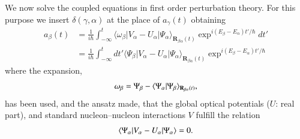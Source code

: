 \begin{subappendices}
 
 We now solve the coupled equations in first order perturbation theory. For this purpose we insert $\delta(\gamma,\alpha)$ at the place of $a_\gamma(t)$ obtaining 
 \begin{align}\label{eqintroB17}
 \nonumber a_\beta(t)&=\frac{1}{i\hbar}\int_{-\infty}^{t}\langle\omega_\beta|V_\alpha-U_\alpha|\Psi_\alpha\rangle_{\mathbf R_{\beta\alpha}(t)}\exp^{i(E_\beta-E_\alpha)t'/\hbar}dt'\\
 &=\frac{1}{i\hbar}\int_{-\infty}^{t}dt'\langle\Psi_\beta|V_\alpha-U_\alpha|\Psi_\alpha\rangle_{\mathbf R_{\beta\alpha}(t)}\exp^{i(E_\beta-E_\alpha)t'/\hbar}
 \end{align}
 where the expansion,
 \begin{align}\label{eqintroB18}
 \omega_\beta=\Psi_\beta-\langle {\Psi_\alpha|\Psi_\beta} \rangle_{\mathbf R_{\beta\alpha}(t)},
 \end{align}
 has been used, and the ansatz made, that the
 global optical potentials ($U$: real part), and standard nucleon--nucleon interactions $V$  fulfill the relation
 \begin{align}
 \langle {\Psi_\alpha|V_\alpha-U_\alpha|\Psi_\alpha} \rangle=0.
 \end{align}
 

\end{subappendices}
